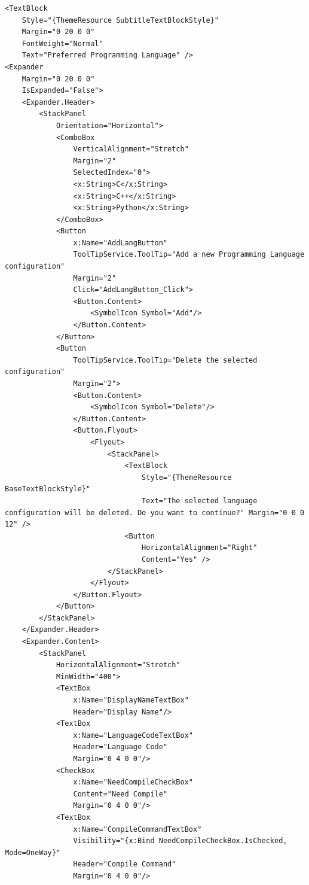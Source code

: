 \documentclass[a4paper]{report}
\begin{document}
\begin{verbatim}
<TextBlock
    Style="{ThemeResource SubtitleTextBlockStyle}"
    Margin="0 20 0 0"
    FontWeight="Normal"
    Text="Preferred Programming Language" />
<Expander
    Margin="0 20 0 0"
    IsExpanded="False">
    <Expander.Header>
        <StackPanel 
            Orientation="Horizontal">
            <ComboBox
                VerticalAlignment="Stretch"
                Margin="2"
                SelectedIndex="0">
                <x:String>C</x:String>
                <x:String>C++</x:String>
                <x:String>Python</x:String>
            </ComboBox>
            <Button 
                x:Name="AddLangButton"
                ToolTipService.ToolTip="Add a new Programming Language configuration"
                Margin="2"
                Click="AddLangButton_Click">
                <Button.Content>
                    <SymbolIcon Symbol="Add"/>
                </Button.Content>
            </Button>
            <Button 
                ToolTipService.ToolTip="Delete the selected configuration"
                Margin="2">
                <Button.Content>
                    <SymbolIcon Symbol="Delete"/>
                </Button.Content>
                <Button.Flyout>
                    <Flyout>
                        <StackPanel>
                            <TextBlock 
                                Style="{ThemeResource BaseTextBlockStyle}"
                                Text="The selected language configuration will be deleted. Do you want to continue?" Margin="0 0 0 12" />
                            <Button 
                                HorizontalAlignment="Right"
                                Content="Yes" />
                        </StackPanel>
                    </Flyout>
                </Button.Flyout>
            </Button>
        </StackPanel>
    </Expander.Header>
    <Expander.Content>
        <StackPanel
            HorizontalAlignment="Stretch"
            MinWidth="400">
            <TextBox
                x:Name="DisplayNameTextBox"
                Header="Display Name"/>
            <TextBox
                x:Name="LanguageCodeTextBox"
                Header="Language Code"
                Margin="0 4 0 0"/>
            <CheckBox
                x:Name="NeedCompileCheckBox"
                Content="Need Compile"
                Margin="0 4 0 0"/>
            <TextBox
                x:Name="CompileCommandTextBox"
                Visibility="{x:Bind NeedCompileCheckBox.IsChecked, Mode=OneWay}"
                Header="Compile Command"
                Margin="0 4 0 0"/>

\end{verbatim}
\end{document}
